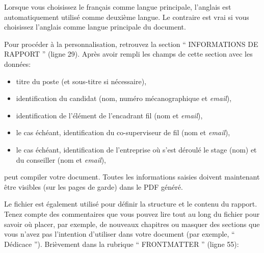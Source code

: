 Lorsque vous choisissez le français comme langue principale, l'anglais est automatiquement utilisé comme deuxième langue. Le contraire est vrai si vous choisissez l'anglais comme langue principale du document.

Pour procéder à la personnalisation, retrouvez la section `` INFORMATIONS DE RAPPORT '' (ligne 29). Après avoir rempli les champs de cette section avec les données:
\begin{itemize}
    \item titre du poste (et sous-titre si nécessaire),
    \item identification du candidat (nom, numéro mécanographique et \textit{email}),
    \item identification de l'élément de l'encadrant \ac{fil} (nom et \textit{email}),
    \item le cas échéant, identification du co-superviseur de \ac{fil} (nom et \textit{email}),
    \item le cas échéant, identification de l'entreprise où s'est déroulé le stage (nom) et du conseiller (nom et \textit{email}),
\end{itemize}

\noindent peut compiler votre document. Toutes les informations saisies doivent maintenant être visibles (sur les pages de garde) dans le PDF généré.

Le fichier  est également utilisé pour définir la structure et le contenu du rapport. Tenez compte des commentaires que vous pouvez lire tout au long du fichier pour savoir où placer, par exemple, de nouveaux chapitres ou masquer des sections que vous n'avez pas l'intention d'utiliser dans votre document (par exemple, `` Dédicace ''). Brièvement dans la rubrique `` FRONTMATTER '' (ligne 55):

